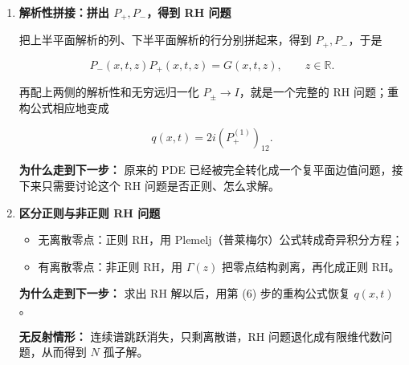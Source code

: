 \documentclass[
    lang=cn,
    scheme=chinese,
    mode=simple,
    device=normal,
    color=blue,
    math=cm,
    thmcnt=section,
    12pt
]{elegantbook}
\begin{document}
\begin{enumerate}[(1)]
          把第 (3) 步写成全微分

          \[
              \mathrm{d}\!\left(e^{i\theta\widehat{\sigma}_3}\mu\right)
              =
              e^{i\theta\widehat{\sigma}_3}
              \left[(P\,\mathrm{d}x+Q\,\mathrm{d}t)\mu\right].
          \]

          沿 $x$ 从左右无穷远积分，得到两个特征函数 $\mu_1,\mu_2$（即两个 Volterra 积分方程）；它们作为同一个 Lax 对的基本矩阵解，彼此相差一个与 $x,t$ 无关的矩阵

          \[
              \psi_1=\psi_2S(z).
          \]

          $S(z)$ 就是谱矩阵（散射矩阵），它把初值 $q_0$ 编码成谱数据。

          \textbf{为什么走到下一步：}
          积分核里出现 $e^{\pm2iz(x-y)}$，它在上下半平面的衰减性直接决定 $\mu_1,\mu_2$ 各列、各行的解析区域。

    \item \textbf{解析性拼接：拼出 $P_+,P_-$，得到 RH 问题}

          把上半平面解析的列、下半平面解析的行分别拼起来，得到 $P_+,P_-$，于是

          \[
              P_-(x,t,z)P_+(x,t,z)=G(x,t,z),
              \qquad z\in\mathbb{R}.
          \]

          再配上两侧的解析性和无穷远归一化 $P_\pm\to I$，就是一个完整的 RH 问题；重构公式相应地变成

          \[
              q(x,t)=2i(P_+^{(1)})_{12}.
          \]

          \textbf{为什么走到下一步：}
          原来的 PDE 已经被完全转化成一个复平面边值问题，接下来只需要讨论这个 RH 问题是否正则、怎么求解。

    \item \textbf{区分正则与非正则 RH 问题}

          \begin{itemize}
              \item 无离散零点：正则 RH，用 Plemelj（普莱梅尔）公式转成奇异积分方程；
              \item 有离散零点：非正则 RH，用 $\Gamma(z)$ 把零点结构剥离，再化成正则 RH。
          \end{itemize}

          \textbf{为什么走到下一步：}
          求出 RH 解以后，用第 (6) 步的重构公式恢复 $q(x,t)$。

          \textbf{无反射情形：}
          连续谱跳跃消失，只剩离散谱，RH 问题退化成有限维代数问题，从而得到 $N$ 孤子解。

\end{enumerate}
\end{document}
